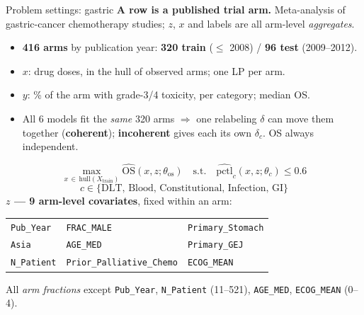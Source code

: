 \documentclass{beamer}
\begin{document}
\begin{frame}{Problem settings: gastric}
  \small
  \textbf{A row is a published trial arm.} Meta-analysis of gastric-cancer
  chemotherapy studies; $z$, $x$ and labels are all arm-level \emph{aggregates}.
  \begin{itemize}
    \item \textbf{416 arms} by publication year:
      \textbf{320 train} ($\le$ 2008) / \textbf{96 test} (2009--2012).
    \item $x$: drug doses, in the hull of observed arms; one LP per arm.
    \item $y$: \% of the arm with grade-3/4 toxicity, per category; median OS.
    \item All 6 models fit the \emph{same} 320 arms $\Rightarrow$ one relabeling
      $\delta$ can move them together (\textbf{coherent}); \textbf{incoherent}
      gives each its own $\delta_c$. OS always independent.
  \end{itemize}
  \[
    \max_{x\,\in\,\mathrm{hull}(X_\text{train})} \widehat{\text{OS}}(x,z;\theta_\text{os})
    \quad\text{s.t.}\quad \widehat{\text{pctl}}_c(x,z;\theta_c) \le 0.6
  \]
  \[
    c\in\{\text{DLT, Blood, Constitutional, Infection, GI}\}
  \]
  \textbf{$z$ --- 9 arm-level covariates}, fixed within an arm:
  \begin{center}\footnotesize
  \begin{tabular}{@{}lll@{}}
    \texttt{Pub\_Year} & \texttt{FRAC\_MALE} & \texttt{Primary\_Stomach} \\
    \texttt{Asia} & \texttt{AGE\_MED} & \texttt{Primary\_GEJ} \\
    \texttt{N\_Patient} & \texttt{Prior\_Palliative\_Chemo} & \texttt{ECOG\_MEAN} \\
  \end{tabular}
  \end{center}
  \footnotesize
  All \emph{arm fractions} except \texttt{Pub\_Year}, \texttt{N\_Patient}
  (11--521), \texttt{AGE\_MED}, \texttt{ECOG\_MEAN} (0--4).
\end{frame}
\end{document}
